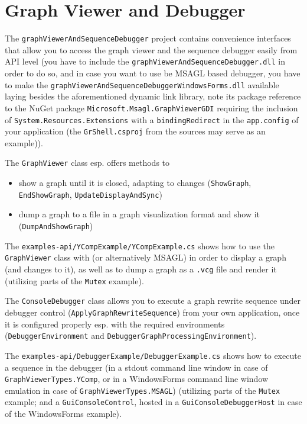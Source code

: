 \section{Graph Viewer and Debugger}
The \texttt{graph\-Viewer\-And\-Sequence\-Debugger} project contains convenience interfaces that allow you to access the graph viewer and the sequence debugger easily from API level (you have to include the \texttt{graph\-Viewer\-And\-Sequence\-Debugger.dll} in order to do so, and in case you want to use be MSAGL based debugger, you have to make the \texttt{graph\-Viewer\-And\-Sequence\-Debugger\-Windows\-Forms.dll} available laying besides the aforementioned dynamic link library, note its package reference to the NuGet package \texttt{Microsoft.Msagl.Graph\-Viewer\-GDI} requiring the inclusion of \texttt{System.Resources.Extensions} with a \texttt{binding\-Redirect} in the \texttt{app.config} of your application (the \texttt{GrShell.csproj} from the sources may serve as an example)).

The \texttt{GraphViewer} class esp. offers methods to
\begin{itemize}
	\item show a graph until it is closed, adapting to changes (\texttt{Show\-Graph}, \texttt{End\-Show\-Graph}, \texttt{Update\-Display\-And\-Sync})
	\item dump a graph to a file in a graph visualization format and show it (\texttt{Dump\-And\-Show\-Graph})
\end{itemize}

The \texttt{examples-api/YCompExample/YCompExample.cs} shows how to use the \texttt{GraphViewer} class with \yComp{} (or alternatively MSAGL) in order to display a graph (and changes to it), as well as to dump a graph as a \texttt{.vcg} file and render it (utilizing parts of the \texttt{Mutex} example).

The \texttt{ConsoleDebugger} class allows you to execute a graph rewrite sequence under debugger control (\texttt{Apply\-Graph\-Rewrite\-Sequence}) from your own application, once it is configured properly esp. with the required environments (\texttt{Debugger\-Environment} and \texttt{Debugger\-Graph\-Processing\-Environment}).

The \texttt{examples-api/DebuggerExample/DebuggerExample.cs} shows how to execute a sequence in the debugger (in a stdout command line window in case of \texttt{GraphViewerTypes.YComp}, or in a WindowsForms command line window emulation in case of \texttt{GraphViewerTypes.MSAGL}) (utilizing parts of the \texttt{Mutex} example; and a \texttt{Gui\-Console\-Control}, hosted in a \texttt{Gui\-Console\-Debugger\-Host} in case of the WindowsForms example).



